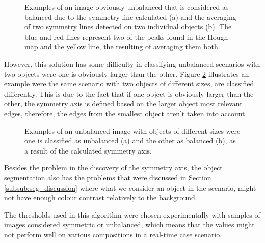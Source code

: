 \begin{figure}[htbp]
	\centering
    \caption{Examples of an image obviously unbalanced that is considered as balanced due to the symmetry line calculated (a) and the averaging of two symmetry lines detected on two individual objects (b). The blue and red lines represent two of the peaks found in the Hough map and the yellow line, the resulting of averaging them both.}
    \label{fig:image_balance_example}
\end{figure}

However, this solution has some difficulty in classifying unbalanced scenarios with two objects were one is obviously larger than the other. Figure \ref{fig:unbalance_test} illustrates an example were the same scenario with two objects of different sizes, are classified differently. This is due to the fact that if one object is obviously larger than the other, the symmetry axis is defined based on the larger object most relevant edges, therefore, the edges from the smallest object aren't taken into account.

\begin{figure}[htbp]
	\centering
    \caption{Examples of an unbalanced image with objects of different sizes were one is classified as unbalanced (a) and the other as balanced (b), as a result of the calculated symmetry axis.}
    \label{fig:unbalance_test}
\end{figure}


Besides the problem in the discovery of the symmetry axis, the object segmentation also has the problems that were discussed in Section \ref{subsub:seg_discussion} where what we consider an object in the scenario, might not have enough colour contrast relatively to the background.

The thresholds used in this algorithm were chosen experimentally with samples of images considered symmetric or unbalanced, which means that the values might not perform well on various compositions in a real-time case scenario.

